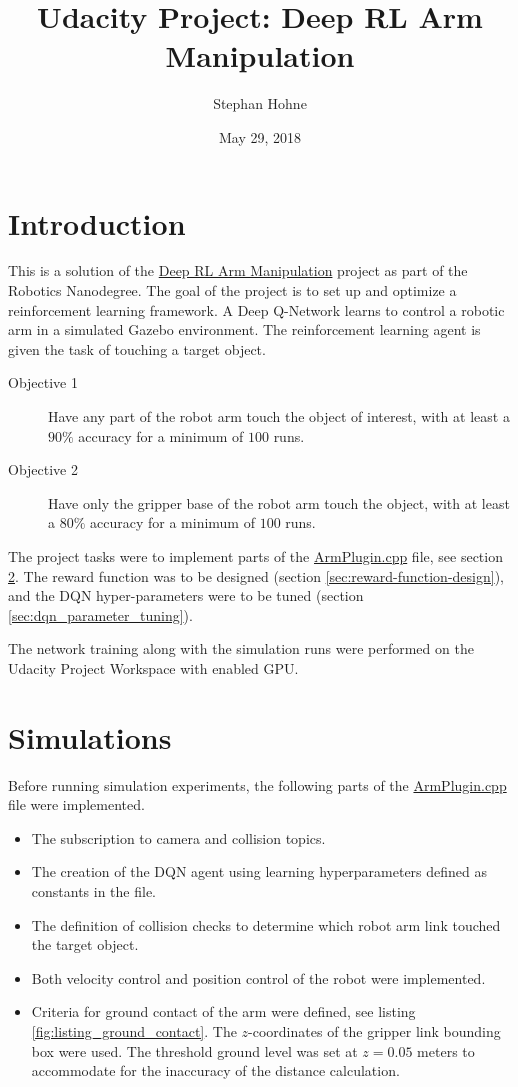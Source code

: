 \documentclass[11pt, onecolumn, oneside, reqno]{amsart}
\title{Udacity Project: Deep RL Arm Manipulation}
\author{Stephan Hohne}
\date{May 29, 2018}
\begin{document}
\maketitle

\section{Introduction}
This is a solution of the \href{https://github.com/udacity/RoboND-DeepRL-Project}{Deep RL Arm Manipulation} project as part of the Robotics Nanodegree. The goal of the project is to set up and optimize a reinforcement learning framework. A Deep Q-Network learns to control a robotic arm in a simulated Gazebo environment. The reinforcement learning agent is given the task of touching a target object.
\begin{description}
\item[Objective 1] Have any part of the robot arm touch the object of interest, with at least a $90\%$ accuracy for a minimum of $100$ runs.
\item[Objective 2] Have only the gripper base of the robot arm touch the object, with at least a $80\%$ accuracy for a minimum of $100$ runs.
\end{description}

The project tasks were to implement parts of the \href{https://github.com/S2H-Mobile/RoboND-DeepRL-Project-Solution/blob/develop/gazebo/ArmPlugin.cpp}{ArmPlugin.cpp} file, see section \ref{sec:simulations}. The reward function was to be designed (section \ref{sec:reward-function-design}), and the DQN hyper-parameters were to be tuned (section \ref{sec:dqn_parameter_tuning}).

The network training along with the simulation runs were performed on the Udacity Project Workspace with enabled GPU.
 
\section{Simulations}
\label{sec:simulations}
Before running simulation experiments, the following parts of the \href{https://github.com/S2H-Mobile/RoboND-DeepRL-Project-Solution/blob/develop/gazebo/ArmPlugin.cpp}{ArmPlugin.cpp} file were implemented.
\begin{itemize}
\item The subscription to camera and collision topics.
\item The creation of the DQN agent using learning hyperparameters defined as constants in the file.
\item The definition of collision checks to determine which robot arm link touched the target object.
\item Both velocity control and position control of the robot were implemented.
\item Criteria for ground contact of the arm were defined, see listing \ref{fig:listing_ground_contact}. The $z$-coordinates of the gripper link bounding box were used. The threshold ground level was set at $z=0.05$ meters to accommodate for the inaccuracy of the distance calculation.
\end{itemize}
\end{document}
